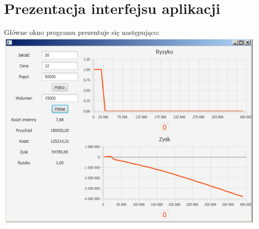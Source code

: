 \documentclass[10pt,a4paper]{article}
\begin{document}
\section{Prezentacja interfejsu aplikacji}
Główne okno programu prezentuje się następująco:\\
\includegraphics[scale=0.75]{screen}
\end{document}
